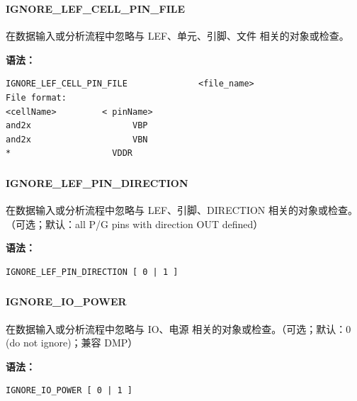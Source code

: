 \subsubsection{}
\paragraph*{IGNORE_LEF_CELL_PIN_FILE}

在数据输入或分析流程中忽略与 LEF、单元、引脚、文件 相关的对象或检查。

\textbf{语法：}
\begin{lstlisting}
IGNORE_LEF_CELL_PIN_FILE              <file_name>
File format:
<cellName>         < pinName>
and2x                    VBP
and2x                    VBN
*                    VDDR
\end{lstlisting}

\subsubsection{}
\paragraph*{IGNORE_LEF_PIN_DIRECTION}

在数据输入或分析流程中忽略与 LEF、引脚、DIRECTION 相关的对象或检查。（可选；默认：all P/G pins with direction OUT defined）

\textbf{语法：}
\begin{lstlisting}
IGNORE_LEF_PIN_DIRECTION [ 0 | 1 ]
\end{lstlisting}

\subsubsection{}
\paragraph*{IGNORE_IO_POWER}

在数据输入或分析流程中忽略与 IO、电源 相关的对象或检查。（可选；默认：0 (do not ignore)；兼容 DMP）

\textbf{语法：}
\begin{lstlisting}
IGNORE_IO_POWER [ 0 | 1 ]
\end{lstlisting}

\subsubsection{}
